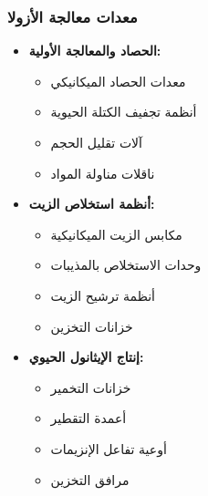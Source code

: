 \subsubsection{معدات معالجة الأزولا}
\begin{itemize}
    \item \textbf{الحصاد والمعالجة الأولية:}
    \begin{itemize}
        \item معدات الحصاد الميكانيكي
        \item أنظمة تجفيف الكتلة الحيوية
        \item آلات تقليل الحجم
        \item ناقلات مناولة المواد
    \end{itemize}
    
    \item \textbf{أنظمة استخلاص الزيت:}
    \begin{itemize}
        \item مكابس الزيت الميكانيكية
        \item وحدات الاستخلاص بالمذيبات
        \item أنظمة ترشيح الزيت
        \item خزانات التخزين
    \end{itemize}
    
    \item \textbf{إنتاج الإيثانول الحيوي:}
    \begin{itemize}
        \item خزانات التخمير
        \item أعمدة التقطير
        \item أوعية تفاعل الإنزيمات
        \item مرافق التخزين
    \end{itemize}
\end{itemize}

